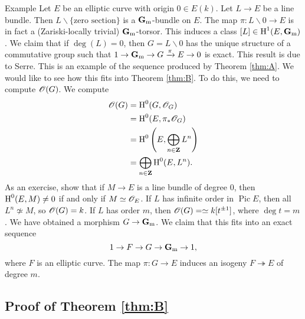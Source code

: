 \begin{enonce}{Example}
Let $E$ be an elliptic curve with origin $0\in E(k)$. Let $L\to E$ be a line 
bundle. Then $L\smallsetminus \{\text{zero section}\}$ is a $\mathbf{G}_{\mathrm{m}}$-bundle 
on $E$. The map $\pi:L\smallsetminus0 \to E$ is in fact a (Zariski-locally 
trivial) $\mathbf{G}_{\mathrm{m}}$-torsor. This induces a class $[L]\in \operatorname{H}^1(E,\mathbf{G}_{\mathrm{m}})$. 
We claim that if $\deg(L)=0$, then $G=L\smallsetminus 0$ has the unique structure 
of a commutative group such that $1 \to \mathbf{G}_{\mathrm{m}} \to G \xrightarrow\pi E \to 0$ 
is exact. This result is due to Serre. This is an example of the sequence produced 
by Theorem \ref{thm:A}. We would like to see how this fits into Theorem 
\ref{thm:B}. To do this, we need to compute $\mathscr{O}(G)$. We compute 
\begin{align*}
  \mathscr{O}(G) &= \operatorname{H}^0(G,\mathscr{O}_G) \\
    &= \operatorname{H}^0(E,\pi_\ast \mathscr{O}_G) \\
    &= \operatorname{H}^0\left(E,\bigoplus_{n\in \mathbf{Z}} L^n\right) \\
    &= \bigoplus_{n\in \mathbf{Z}} \operatorname{H}^0(E,L^n) .
\end{align*}
As an exercise, show that if $M\to E$ is a line bundle of degree $0$, then 
$\operatorname{H}^0(E,M)\ne 0$ if and only if $M\simeq \mathscr{O}_E$. If $L$ has infinite order 
in $\operatorname{Pic} E$, then all $L^n\not\simeq M$, so $\mathscr{O}(G)=k$. If 
$L$ has order $m$, then $\mathscr{O}(G)=\simeq k[t^{\pm 1}]$, where 
$\deg t=m$. We have obtained a morphism $G\to \mathbf{G}_{\mathrm{m}}$. We claim that this 
fits into an exact sequence 
\[
  1 \to F \to G \to \mathbf{G}_{\mathrm{m}} \to 1 ,
\]
where $F$ is an elliptic curve. The map $\pi:G\to E$ induces an isogeny 
$F\twoheadrightarrow E$ of degree $m$. 
\end{enonce}





\subsection{Proof of \texorpdfstring{Theorem \ref{thm:B}}{Theorem B}}

